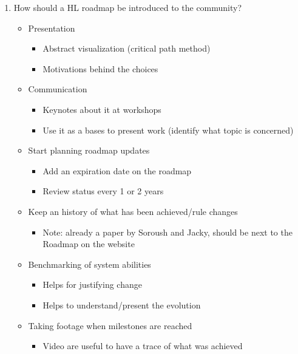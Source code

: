\documentclass{article}
\begin{document}
\begin{enumerate}
\begin{enumerate}
\begin{itemize}
\begin{itemize}
   \end{itemize}
   \end{itemize}
       \item How should a HL roadmap be introduced to the community?
       \begin{itemize} 
           \item Presentation
           \begin{itemize} 
               \item Abstract visualization (critical path method)
               \item Motivations behind the choices
       \end{itemize}
           \item Communication
           \begin{itemize} 
               \item Keynotes about it at workshops
               \item Use it as a bases to present work (identify what topic is concerned)
       \end{itemize}
           \item Start planning roadmap updates
           \begin{itemize} 
               \item Add an expiration date on the roadmap
               \item Review status every 1 or 2 years
       \end{itemize}
           \item Keep an history of what has been achieved/rule changes
           \begin{itemize} 
               \item Note: already a paper by Soroush and Jacky, should be next to the Roadmap on the website
       \end{itemize}
           \item Benchmarking of system abilities
           \begin{itemize} 
               \item Helps for justifying change
               \item Helps to understand/present the evolution
       \end{itemize}
           \item Taking footage when milestones are reached
           \begin{itemize} 
               \item Video are useful to have a trace of what was achieved
           \end{itemize}

       \end{itemize}

   \end{enumerate}

\end{enumerate}
\end{document}
